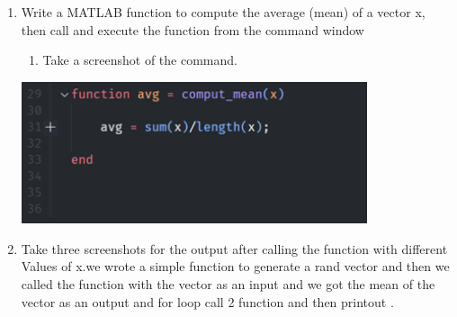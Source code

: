 \documentclass[12pt,a4paper]{article}
\begin{document}
\begin{enumerate}
\item Write a MATLAB function to compute the average (mean) of a vector x, then call and execute the function from the command window 
\begin{enumerate}
  \item Take a screenshot of the command.  
\end{enumerate}
\includegraphics[width=0.8\textwidth]{images/Picture3.png}~\\[3cm]

\item  Take three screenshots for the output after calling the function with different Values of x.we wrote a simple function to generate a rand vector and then we called the function with the vector as an input and we got the mean of the vector as an output and for loop call 2 function and then printout .



\end{enumerate}
\end{document}
